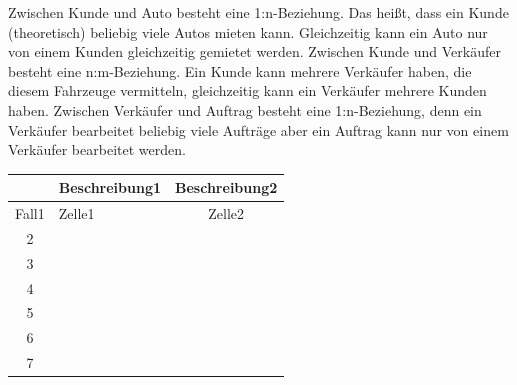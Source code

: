 \documentclass[a4paper,12pt]{article}
\begin{document}
Zwischen Kunde und Auto besteht eine 1:n-Beziehung. Das heißt, dass ein Kunde (theoretisch) beliebig viele Autos mieten kann. Gleichzeitig kann ein Auto nur von einem Kunden gleichzeitig gemietet werden.
Zwischen Kunde und Verkäufer besteht eine n:m-Beziehung. Ein Kunde kann mehrere Verkäufer haben, die diesem Fahrzeuge vermitteln, gleichzeitig kann ein Verkäufer mehrere Kunden haben.
Zwischen Verkäufer und Auftrag besteht eine 1:n-Beziehung, denn ein Verkäufer bearbeitet beliebig viele Aufträge aber ein Auftrag kann nur von einem Verkäufer bearbeitet werden.

\begin{tabular} [h] {||c|l|c||} 
\hline \rule[-1.5mm]{0pt}{5.5ex} & \normalsize Beschreibung1 & Beschreibung2 \\ 
\hline
\hline \rule[-1.5mm]{0pt}{5.5ex} Fall1 & Zelle1 & Zelle2 \\ 
\hline \rule[-1.5mm]{0pt}{5.5ex} 2 &  & \\ 
\hline \rule[-1.5mm]{0pt}{5.5ex} 3 &  & \\ 
\hline \rule[-1.5mm]{0pt}{5.5ex} 4 &  & \\ 
\hline \rule[-1.5mm]{0pt}{5.5ex} 5 &  & \\ 
\hline \rule[-1.5mm]{0pt}{5.5ex} 6 &  & \\ 
\hline \rule[-1.5mm]{0pt}{5.5ex} 7 &  & \\ 
\hline
\end{tabular}
\end{document}
